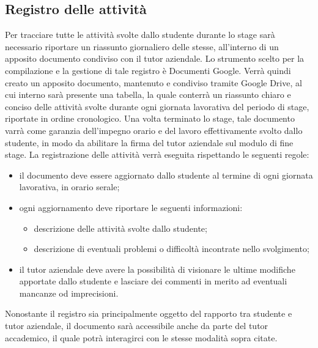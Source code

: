	\subsection{Registro delle attività}
		Per tracciare tutte le attività svolte dallo studente durante lo stage sarà necessario riportare un riassunto giornaliero delle stesse, all’interno di un apposito documento condiviso con il tutor aziendale.
		\newline
		Lo strumento scelto per la compilazione e la gestione di tale registro è Documenti Google. Verrà quindi creato un apposito documento, mantenuto e condiviso tramite Google Drive, al cui interno sarà presente una tabella, la quale conterrà un riassunto chiaro e conciso delle attività svolte durante ogni giornata lavorativa del periodo di stage, riportate in ordine cronologico.
		\newline
		Una volta terminato lo stage, tale documento varrà come garanzia dell'impegno orario e del lavoro effettivamente svolto dallo studente, in modo da abilitare la firma del tutor aziendale sul modulo di fine stage.
		\newline
		La registrazione delle attività verrà eseguita rispettando le seguenti regole:
		\begin{itemize}
			\item il documento deve essere aggiornato dallo studente al termine di ogni giornata lavorativa, in orario serale;
			\item ogni aggiornamento deve riportare le seguenti informazioni:
			\begin{itemize}
				\item descrizione delle attività svolte dallo studente;
				\item descrizione di eventuali problemi o difficoltà incontrate nello svolgimento;
			\end{itemize}
			\item il tutor aziendale deve avere la possibilità di visionare le ultime modifiche apportate dallo studente e lasciare dei commenti in merito ad eventuali mancanze od imprecisioni.
		\end{itemize}
		Nonostante il registro sia principalmente oggetto del rapporto tra studente e tutor aziendale, il documento sarà accessibile anche da parte del tutor accademico, il quale potrà interagirci con le stesse modalità sopra citate.

	
